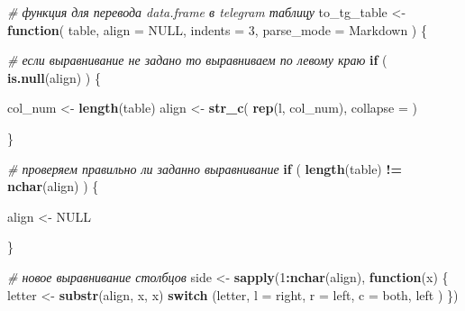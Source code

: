 \documentclass[
]{book}
\newenvironment{Shaded}{\begin{snugshade}}{\end{snugshade}}
\newcommand{\AttributeTok}[1]{\textcolor[rgb]{0.13,0.29,0.53}{#1}}
\newcommand{\CommentTok}[1]{\textcolor[rgb]{0.56,0.35,0.01}{\textit{#1}}}
\newcommand{\ConstantTok}[1]{\textcolor[rgb]{0.56,0.35,0.01}{#1}}
\newcommand{\ControlFlowTok}[1]{\textcolor[rgb]{0.13,0.29,0.53}{\textbf{#1}}}
\newcommand{\DecValTok}[1]{\textcolor[rgb]{0.00,0.00,0.81}{#1}}
\newcommand{\FunctionTok}[1]{\textcolor[rgb]{0.13,0.29,0.53}{\textbf{#1}}}
\newcommand{\NormalTok}[1]{#1}
\newcommand{\OtherTok}[1]{\textcolor[rgb]{0.56,0.35,0.01}{#1}}
\newcommand{\SpecialCharTok}[1]{\textcolor[rgb]{0.81,0.36,0.00}{\textbf{#1}}}
\newcommand{\StringTok}[1]{\textcolor[rgb]{0.31,0.60,0.02}{#1}}
\begin{document}
\begin{Shaded}
\begin{Highlighting}[]
\CommentTok{\# функция для перевода data.frame в telegram таблицу }
\NormalTok{to\_tg\_table }\OtherTok{\textless{}{-}} \ControlFlowTok{function}\NormalTok{( table, }\AttributeTok{align =} \ConstantTok{NULL}\NormalTok{, }\AttributeTok{indents =} \DecValTok{3}\NormalTok{, }\AttributeTok{parse\_mode =} \StringTok{\textquotesingle{}Markdown\textquotesingle{}}\NormalTok{ ) \{}
  
  \CommentTok{\# если выравнивание не задано то выравниваем по левому краю}
  \ControlFlowTok{if}\NormalTok{ ( }\FunctionTok{is.null}\NormalTok{(align) ) \{}
    
\NormalTok{    col\_num }\OtherTok{\textless{}{-}} \FunctionTok{length}\NormalTok{(table)}
\NormalTok{    align   }\OtherTok{\textless{}{-}} \FunctionTok{str\_c}\NormalTok{( }\FunctionTok{rep}\NormalTok{(}\StringTok{\textquotesingle{}l\textquotesingle{}}\NormalTok{, col\_num), }\AttributeTok{collapse =} \StringTok{\textquotesingle{}\textquotesingle{}}\NormalTok{ )}
    
\NormalTok{  \}}
  
  \CommentTok{\# проверяем правильно ли заданно выравнивание}
  \ControlFlowTok{if}\NormalTok{ ( }\FunctionTok{length}\NormalTok{(table) }\SpecialCharTok{!=} \FunctionTok{nchar}\NormalTok{(align) ) \{}
    
\NormalTok{    align }\OtherTok{\textless{}{-}} \ConstantTok{NULL}
    
\NormalTok{  \}}
  
  \CommentTok{\# новое выравнивание столбцов }
\NormalTok{  side }\OtherTok{\textless{}{-}} \FunctionTok{sapply}\NormalTok{(}\DecValTok{1}\SpecialCharTok{:}\FunctionTok{nchar}\NormalTok{(align), }
                 \ControlFlowTok{function}\NormalTok{(x) \{ }
\NormalTok{                   letter }\OtherTok{\textless{}{-}} \FunctionTok{substr}\NormalTok{(align, x, x)}
                   \ControlFlowTok{switch}\NormalTok{ (letter,}
                           \StringTok{\textquotesingle{}l\textquotesingle{}} \OtherTok{=} \StringTok{\textquotesingle{}right\textquotesingle{}}\NormalTok{,}
                           \StringTok{\textquotesingle{}r\textquotesingle{}} \OtherTok{=} \StringTok{\textquotesingle{}left\textquotesingle{}}\NormalTok{,}
                           \StringTok{\textquotesingle{}c\textquotesingle{}} \OtherTok{=} \StringTok{\textquotesingle{}both\textquotesingle{}}\NormalTok{,}
                           \StringTok{\textquotesingle{}left\textquotesingle{}}
\NormalTok{                   )}
\NormalTok{                 \})}
  

\end{Highlighting}
\end{Shaded}
\end{document}
